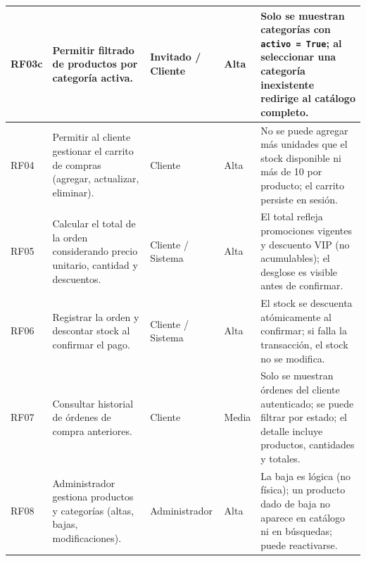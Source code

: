 \documentclass[12pt,a4paper]{article}
\begin{document}
\begin{longtable}{|l|p{5.5cm}|p{3cm}|p{1.5cm}|p{4cm}|}
    RF03c       & Permitir filtrado de productos por categoría activa.                                       & Invitado / Cliente       & Alta            &
    Solo se muestran categorías con \texttt{activo = True}; al seleccionar una categoría inexistente redirige al catálogo completo.                                                         \\ \hline

    RF04        & Permitir al cliente gestionar el carrito de compras (agregar, actualizar, eliminar).       & Cliente                  & Alta            &
    No se puede agregar más unidades que el stock disponible ni más de 10 por producto; el carrito persiste en sesión.                                                                      \\ \hline

    RF05        & Calcular el total de la orden considerando precio unitario, cantidad y descuentos.         & Cliente / Sistema        & Alta            &
    El total refleja promociones vigentes y descuento VIP (no acumulables); el desglose es visible antes de confirmar.                                                                      \\ \hline

    RF06        & Registrar la orden y descontar stock al confirmar el pago.                                 & Cliente / Sistema        & Alta            &
    El stock se descuenta atómicamente al confirmar; si falla la transacción, el stock no se modifica.                                                                                      \\ \hline

    RF07        & Consultar historial de órdenes de compra anteriores.                                       & Cliente                  & Media           &
    Solo se muestran órdenes del cliente autenticado; se puede filtrar por estado; el detalle incluye productos, cantidades y totales.                                                      \\ \hline

    RF08        & Administrador gestiona productos y categorías (altas, bajas, modificaciones).              & Administrador            & Alta            &
    La baja es lógica (no física); un producto dado de baja no aparece en catálogo ni en búsquedas; puede reactivarse.                                                                      \\ \hline


\end{longtable}
\end{document}
